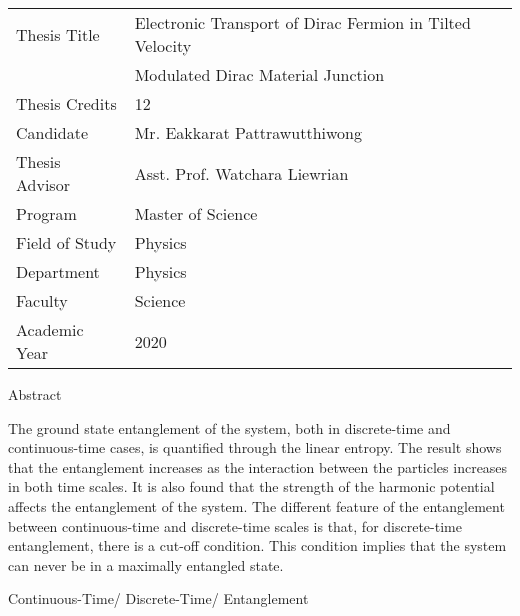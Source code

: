\noindent 
{\begin{tabular}{ll} 
  Thesis Title &  Electronic Transport of Dirac Fermion in Tilted Velocity \\
               &  Modulated Dirac Material Junction \\
  Thesis Credits & 12 \\
  Candidate & Mr. Eakkarat Pattrawutthiwong \\
  Thesis Advisor & Asst. Prof. Watchara Liewrian \\
  Program & Master of Science  \\
  Field of Study & Physics \\
  Department & Physics \\
  Faculty & Science \\
  Academic Year & 2020 \\
\end{tabular}}

\vspace{1cm}

\centerline{Abstract}

\vspace{1cm}

\noindent The ground state entanglement of the system, both in discrete-time and continuous-time cases, 
is quantified through the linear entropy. The result shows that the entanglement increases as the interaction 
between the particles increases in both time scales. It is also found that the strength of the harmonic potential 
affects the entanglement of the system. The different feature of the entanglement between continuous-time and 
discrete-time scales is that, for discrete-time entanglement, there is a cut-off condition. This condition implies that the 
system can never be in a maximally entangled state.

\vspace{1cm}


  Continuous-Time/ Discrete-Time/ Entanglement


  
